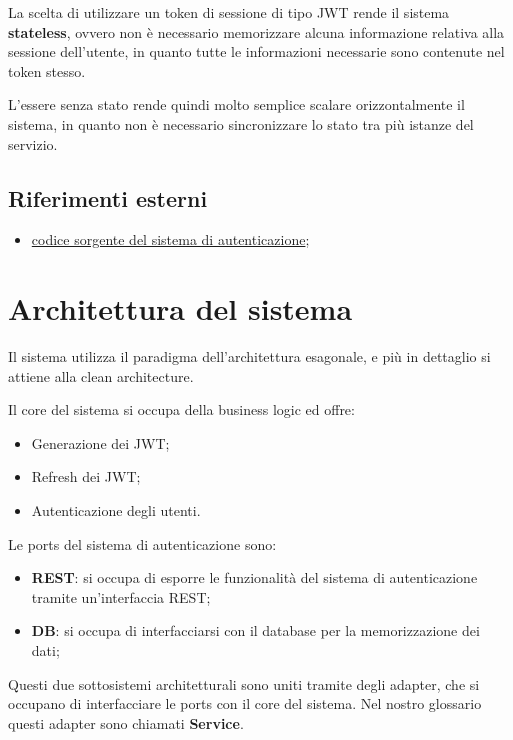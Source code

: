 La scelta di utilizzare un token di sessione di tipo JWT rende il sistema \textbf{stateless}, ovvero non è necessario memorizzare alcuna informazione relativa alla sessione dell'utente, in quanto tutte le informazioni necessarie sono contenute nel token stesso.

L'essere senza stato rende quindi molto semplice scalare orizzontalmente il sistema, in quanto non è necessario sincronizzare lo stato tra più istanze del servizio.

\subsection{Riferimenti esterni}

\begin{itemize}
    \item \href{https://github.com/SWEasabi/authentication-micro-service}{codice sorgente del sistema di autenticazione};
\end{itemize}

\section{Architettura del sistema}

Il sistema utilizza il paradigma dell'architettura esagonale, e più in dettaglio si attiene alla clean architecture.

Il core del sistema si occupa della business logic ed offre:
\begin{itemize}
    \item Generazione dei JWT;
    \item Refresh dei JWT;
    \item Autenticazione degli utenti.
\end{itemize}

Le ports del sistema di autenticazione sono:
\begin{itemize}
    \item \textbf{REST}: si occupa di esporre le funzionalità del sistema di autenticazione tramite un'interfaccia REST;
    \item \textbf{DB}: si occupa di interfacciarsi con il database per la memorizzazione dei dati;
\end{itemize}

Questi due sottosistemi architetturali sono uniti tramite degli adapter, che si occupano di interfacciare le ports con il core del sistema. Nel nostro glossario questi adapter sono chiamati \textbf{Service}.

